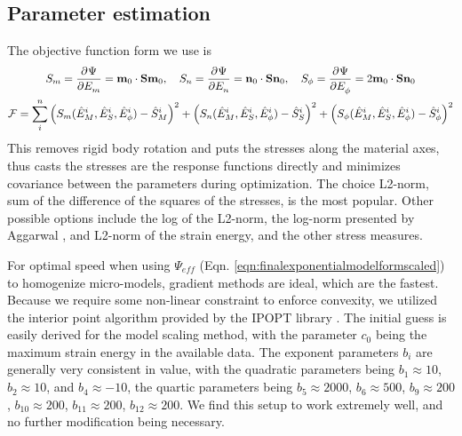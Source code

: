 \subsection{Parameter estimation}

	The objective function form we use is 
\begin{subequations}\label{eqn:objectivefunction}
\begin{gather}
S_m = \dpd{\Psi}{E_m} = \mathbf{m}_0\cdot\mathbf{S}\mathbf{m}_0,
	\quad S_n = \dpd{\Psi}{E_n} = \mathbf{n}_0\cdot\mathbf{S}\mathbf{n}_0,
    \quad S_\phi = \dpd{\Psi}{E_\phi} = 2\mathbf{m}_0\cdot\mathbf{S}\mathbf{n}_0 \label{eqn:responsefunctions}\\
\mathcal{F} = \sum_i^n \left(S_m(\hat{E}_M^i, \hat{E}_S^i, \hat{E}_\phi^i) - \hat{S}_M^i \right)^2 + \left(S_n(\hat{E}_M^i, \hat{E}_S^i, \hat{E}_\phi^i) - \hat{S}_S^i \right)^2 + \left(S_\phi(\hat{E}_M^i, \hat{E}_S^i, \hat{E}_\phi^i) - \hat{S}_\phi^i \right)^2
\end{gather}
\end{subequations}
This removes rigid body rotation and puts the stresses along the material axes, thus casts the stresses are the response functions directly and minimizes covariance between the parameters during optimization. The choice L2-norm, sum of the difference of the squares of the stresses, is the most popular. Other possible options include the log of the L2-norm, the log-norm presented by Aggarwal \cite{aggarwal_improved_2017}, and L2-norm of the strain energy, and the other stress measures.

	For optimal speed when using $\Psi_{eff}$ (Eqn. \ref{eqn:finalexponentialmodelformscaled}) to homogenize micro-models, gradient methods are ideal, which are the fastest. Because we require some non-linear constraint to enforce convexity, we utilized the interior point algorithm provided by the IPOPT library \cite{waechter_implementation_2005}. The initial guess is easily derived for the model scaling method, with the parameter $c_0$ being the maximum strain energy in the available data. The exponent parameters $b_i$ are generally very consistent in value, with the quadratic parameters being $b_1 \approx 10$, $b_2 \approx 10$, and $b_4 \approx -10$, the quartic parameters being $b_5 \approx 2000$, $b_6 \approx 500$, $b_9 \approx 200$, $b_{10} \approx 200$, $b_{11} \approx 200$, $b_{12} \approx 200$. We find this setup to work extremely well, and no further modification being necessary. 




